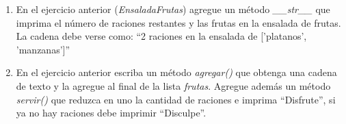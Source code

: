 \begin{enumerate}
\item En el ejercicio anterior (\textit{EnsaladaFrutas}) agregue un método \textit{\_\_str\_\_} que imprima el número de raciones restantes y las frutas en la ensalada de frutas. La cadena debe verse como: ``2 raciones en la ensalada de ['platanos', 'manzanas']''

\item En el ejercicio anterior escriba un método \textit{agregar()} que obtenga una cadena de texto y la agregue al final de la lista \textit{frutas}. Agregue además un método \textit{servir()} que reduzca en uno la cantidad de raciones e imprima ``Disfrute'', si ya no hay raciones debe imprimir ``Disculpe''.

\end{enumerate}